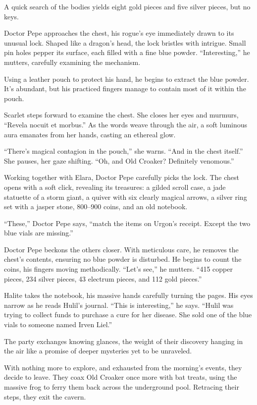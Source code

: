 \documentclass[
  letterpaper,12pt,twoside,twocolumn,openany,
  nodeprecatedcode,bg=full]{dndbook}
\begin{document}
A quick search of the bodies yields eight gold pieces and five silver
pieces, but no keys.

Doctor Pepe approaches the chest, his rogue's eye immediately drawn to
its unusual lock. Shaped like a dragon's head, the lock bristles with
intrigue. Small pin holes pepper its surface, each filled with a fine
blue powder. ``Interesting,'' he mutters, carefully examining the
mechanism.

Using a leather pouch to protect his hand, he begins to extract the blue
powder. It's abundant, but his practiced fingers manage to contain most
of it within the pouch.

Scarlet steps forward to examine the chest. She closes her eyes and
murmurs, ``Revela nocuit et morbus.'' As the words weave through the
air, a soft luminous aura emanates from her hands, casting an ethereal
glow.

``There's magical contagion in the pouch,'' she warns. ``And in the
chest itself.'' She pauses, her gaze shifting. ``Oh, and Old Croaker?
Definitely venomous.''

Working together with Elara, Doctor Pepe carefully picks the lock. The
chest opens with a soft click, revealing its treasures: a gilded scroll
case, a jade statuette of a storm giant, a quiver with six clearly
magical arrows, a silver ring set with a jasper stone, 800--900 coins,
and an old notebook.

``These,'' Doctor Pepe says, ``match the items on Urgon's receipt.
Except the two blue vials are missing.''

Doctor Pepe beckons the others closer. With meticulous care, he removes
the chest's contents, ensuring no blue powder is disturbed. He begins to
count the coins, his fingers moving methodically. ``Let's see,'' he
mutters. ``415 copper pieces, 234 silver pieces, 43 electrum pieces, and
112 gold pieces.''

Halite takes the notebook, his massive hands carefully turning the
pages. His eyes narrow as he reads Hulil's journal. ``This is
interesting,'' he says. ``Hulil was trying to collect funds to purchase
a cure for her disease. She sold one of the blue vials to someone named
Irven Liel.''

The party exchanges knowing glances, the weight of their discovery
hanging in the air like a promise of deeper mysteries yet to be
unraveled.

With nothing more to explore, and exhausted from the morning's events,
they decide to leave. They coax Old Croaker once more with bat treats,
using the massive frog to ferry them back across the underground pool.
Retracing their steps, they exit the cavern.
\end{document}
